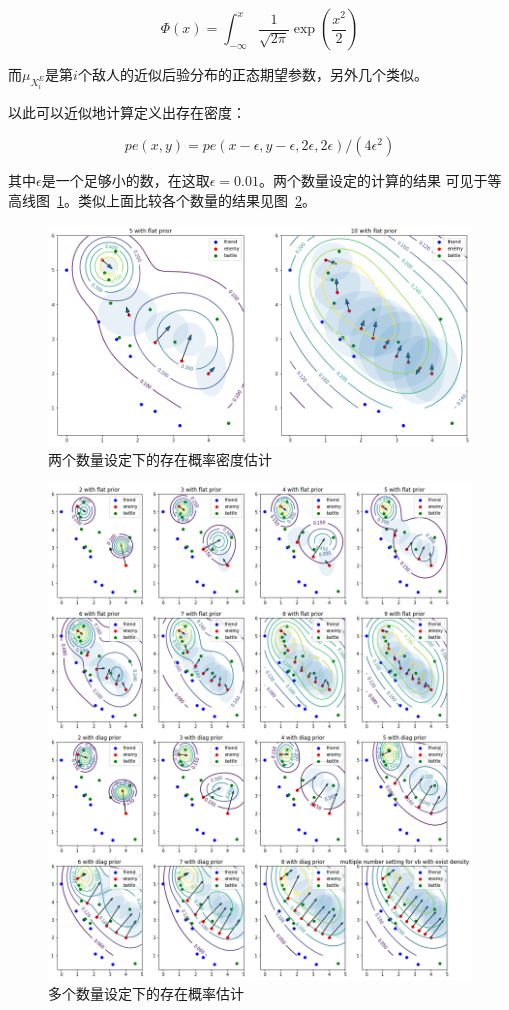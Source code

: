 \documentclass{sicnuthesis}
\begin{document}
$$
\Phi(x) = \int_{-\infty}^x \frac{1}{\sqrt{2\pi}} \exp\left(\frac{x^2}{2}\right)
$$


而$\mu_{X^E_i}$是第$i$个敌人的近似后验分布的正态期望参数，另外几个类似。

以此可以近似地计算定义出存在密度：

$$
pe(x,y) = pe(x-\epsilon,y-\epsilon,2\epsilon,2\epsilon)/(4 \epsilon^2)
$$


其中$\epsilon$是一个足够小的数，在这取$\epsilon=0.01$。两个数量设定的计算的结果
可见于等高线图~\ref{fig:existDensity}。类似上面比较各个数量的结果见图~\ref{fig:bigVbExist}。

\begin{figure}[htb]
\includegraphics[width=0.99\linewidth]{exist_density.png}
\caption{两个数量设定下的存在概率密度估计}
\label{fig:existDensity}
\end{figure}


\begin{figure}[htb]
\includegraphics[width=0.99\linewidth]{big_vb_exist_prob.png}
\caption{多个数量设定下的存在概率估计}
\label{fig:bigVbExist}
\end{figure}
\end{document}

